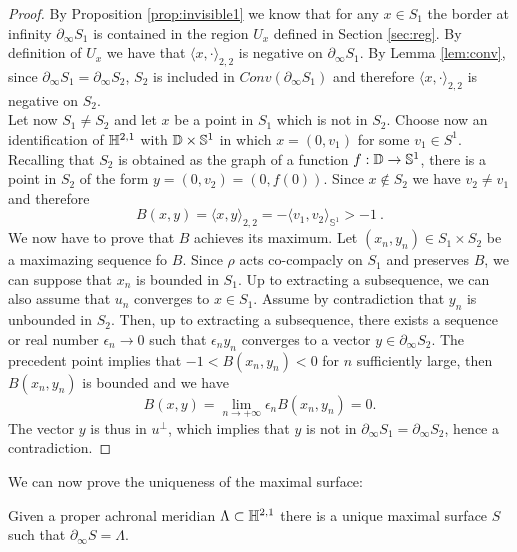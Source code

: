 \begin{proof}
    By Proposition \ref{prop:invisible1} we know that for any $x\in S_1$ the border at infinity $\partial_\infty  S_1$ is contained in the region $U_x$ defined in Section \ref{sec:reg}. By definition of $U_x$ we have that $\langle x, \cdot \rangle_{2,2}$ is negative on $\partial_\infty S_1$. By Lemma \ref{lem:conv}, since $\partial_\infty S_1 = \partial_\infty S_2$, $S_2$ is included in $Conv(\partial_\infty S_1)$ and therefore $\langle x, \cdot \rangle_{2,2}$ is negative on $S_2$.\\
    Let now $S_1 \neq S_2$ and let $x$ be a point in $S_1$ which is not in $S_2$. Choose now an identification of $\mathbb{H}^{2,1}$ with $\mathbb{D} \times \mathbb{S}^1$ in which $x = (0,v_1)$ for some $v_1 \in S^1$. Recalling that $S_2$ is obtained as the graph of a function $f:\mathbb{D} \to \mathbb{S}^1$, there is a point in $S_2$ of the form $y=(0,v_2) = (0, f(0))$. Since $x\notin S_2$ we have $v_2 \neq v_1$ and therefore
    \[
        B(x,y)= \langle x,y \rangle _{2,2} = - \langle v_1, v_2 \rangle _{\mathbb{S}^1} > -1 \ .
    \]
    We now have to prove that $B$ achieves its maximum. Let $(x_n, y_n) \in S_1 \times S_2$  be a maximazing sequence fo $B$. Since $\rho$ acts co-compacly on $S_1$ and preserves $B$, we can suppose that $x_n$ is bounded in $S_1$. Up to extracting a subsequence, we can also assume that $u_n$ converges to $x\in S_1$. Assume by contradiction that $y_n$ is unbounded in $S_2$. Then, up to extracting a subsequence, there exists a sequence or real number $\epsilon_n \to 0$ such that $\epsilon_n y_n$ converges to a vector $y\in \partial_\infty S_2$. The precedent point implies that $-1 < B(x_n, y_n) < 0$ for $n$ sufficiently large, then $B(x_n, y_n)$ is bounded and we have
    \[
        B(x,y) = \lim_{n\to +\infty} \epsilon_n B(x_n,y_n) = 0 .
    \]
    The vector $y$ is thus in $u^\perp$, which implies that $y$ is not in $\partial_\infty S_1 = \partial_\infty S_2$, hence a contradiction.
\end{proof}
We can now prove the uniqueness of the maximal surface:
\begin{theorem} \label{lem:max}
    Given a proper achronal meridian $\Lambda \subset \mathbb{H}^{2,1}$ there is a unique maximal surface $S$ such that $\partial_\infty S = \Lambda$.
\end{theorem}
